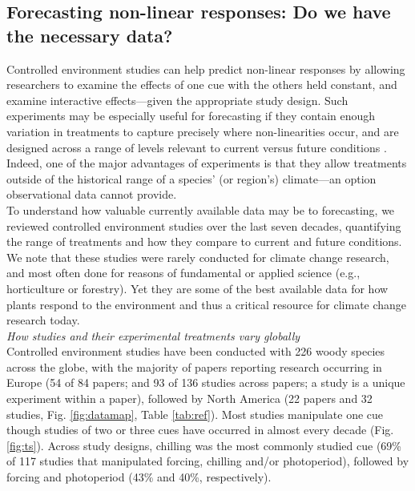 \documentclass[11pt,letter]{article}
\begin{document}
\subsection{Forecasting non-linear responses: Do we have the necessary data?} %
Controlled environment studies can help predict non-linear responses by allowing researchers to examine the effects of one cue with the others held constant, and examine interactive effects---given the appropriate study design. Such experiments may be especially useful for forecasting if they contain enough variation in treatments to capture precisely where non-linearities occur, and are designed across a range of levels relevant to current versus future conditions \citep{shen2015}. Indeed, one of the major advantages of experiments is that they allow treatments outside of the historical range of a species' (or region's) climate---an option observational data cannot provide. \\

To understand how valuable currently available data may be to forecasting, we reviewed controlled environment studies over the last seven decades, quantifying the range of treatments and how they compare to current and future conditions. We note that these studies were rarely conducted for climate change research, and most often done for reasons of fundamental or applied science (e.g., horticulture or forestry). Yet they are some of the best available data for how plants respond to the environment and thus a critical resource for climate change research today.\\

\emph{How studies and their experimental treatments vary globally}\\
Controlled environment studies have been conducted with 226 woody species across the globe, with the majority of papers reporting research occurring in Europe (54 of 84 papers; and 93 of 136 studies across papers; a study is a unique experiment within a paper), followed by North America (22 papers and 32 studies, Fig. \ref{fig:datamap}, Table \ref{tab:ref}). Most studies manipulate one cue though studies of two or three cues have occurred in almost every decade (Fig. \ref{fig:ts}). Across study designs, chilling was the most commonly studied cue (69\% of 117 studies that manipulated forcing, chilling and/or photoperiod), followed by forcing and photoperiod (43\% and 40\%, respectively). \\
\end{document}
